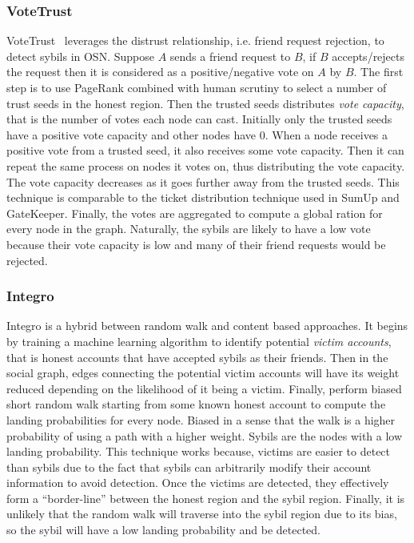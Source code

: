 \subsubsection{VoteTrust}
VoteTrust~\cite{xue2013votetrust} leverages the distrust relationship, i.e.
friend request rejection, to detect sybils in OSN. Suppose $A$ sends a friend
request to $B$, if $B$ accepts/rejects the request then it is considered as a
positive/negative vote on $A$ by $B$. The first step is to use PageRank combined
with human scrutiny to select a number of trust seeds in the honest region. Then
the trusted seeds distributes \emph{vote capacity}, that is the number of votes
each node can cast. Initially only the trusted seeds have a positive vote
capacity and other nodes have 0. When a node receives a positive vote from a
trusted seed, it also receives some vote capacity. Then it can repeat the same
process on nodes it votes on, thus distributing the vote capacity. The vote
capacity decreases as it goes further away from the trusted seeds. This
technique is comparable to the ticket distribution technique used in SumUp and
GateKeeper. Finally, the votes are aggregated to compute a global ration for
every node in the graph. Naturally, the sybils are likely to have a low vote
because their vote capacity is low and many of their friend requests would be
rejected.

\subsubsection{Integro}
Integro\cite{boshmaf2015integro} is a hybrid between random walk and content
based approaches. It begins by training a machine learning algorithm to identify
potential \emph{victim accounts}, that is honest accounts that have accepted
sybils as their friends. Then in the social graph, edges connecting the
potential victim accounts will have its weight reduced depending on the
likelihood of it being a victim. Finally, perform biased short random walk
starting from some known honest account to compute the landing probabilities for
every node. Biased in a sense that the walk is a higher probability of
using a path with a higher weight. Sybils are the nodes with a low landing
probability. This technique works because, victims are easier to detect than
sybils due to the fact that sybils can arbitrarily modify their account
information to avoid detection. Once the victims are detected, they effectively
form a ``border-line'' between the honest region and the sybil region. Finally,
it is unlikely that the random walk will traverse into the sybil region due to
its bias, so the sybil will have a low landing probability and be detected.

